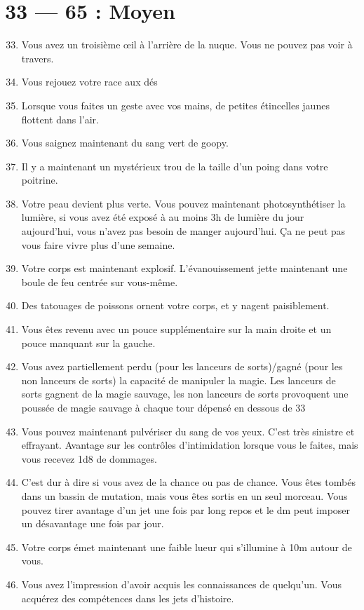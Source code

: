 \documentclass{article}
\begin{document}
\section*{33 --- 65 : Moyen}
\begin{enumerate}
	\setcounter{enumi}{32}
	\item Vous avez un troisième œil à l'arrière de la nuque. Vous ne pouvez pas voir à travers.
	\item Vous rejouez votre race aux dés
	\item Lorsque vous faites un geste avec vos mains, de petites étincelles jaunes flottent dans l'air.
	\item Vous saignez maintenant du sang vert de goopy.
	\item Il y a maintenant un mystérieux trou de la taille d'un poing dans votre poitrine.
	\item Votre peau devient plus verte. Vous pouvez maintenant photosynthétiser la lumière, si vous avez été exposé à au moins 3h de lumière du jour aujourd'hui, vous n'avez pas besoin de manger aujourd'hui. Ça ne peut pas vous faire vivre plus d'une semaine.
	\item Votre corps est maintenant explosif. L'évanouissement jette maintenant une boule de feu centrée sur vous-même.
	\item Des tatouages de poissons ornent votre corps, et y nagent paisiblement.
	\item Vous êtes revenu avec un pouce supplémentaire sur la main droite et un pouce manquant sur la gauche.
	\item Vous avez partiellement perdu (pour les lanceurs de sorts)/gagné (pour les non lanceurs de sorts) la capacité de manipuler la magie. Les lanceurs de sorts gagnent de la magie sauvage, les non lanceurs de sorts provoquent une poussée de magie sauvage à chaque tour dépensé en dessous de 33%
	\item Vous pouvez maintenant pulvériser du sang de vos yeux. C'est très sinistre et effrayant. Avantage sur les contrôles d'intimidation lorsque vous le faites, mais vous recevez 1d8 de dommages.
	\item C'est dur à dire si vous avez de la chance ou pas de chance. Vous êtes tombés dans un bassin de mutation, mais vous êtes sortis en un seul morceau. Vous pouvez tirer avantage d'un jet une fois par long repos et le dm peut imposer un désavantage une fois par jour.
	\item Votre corps émet maintenant une faible lueur qui s'illumine à 10m autour de vous.
	\item Vous avez l'impression d'avoir acquis les connaissances de quelqu'un. Vous acquérez des compétences dans les jets d’histoire.

\end{enumerate}
\end{document}
